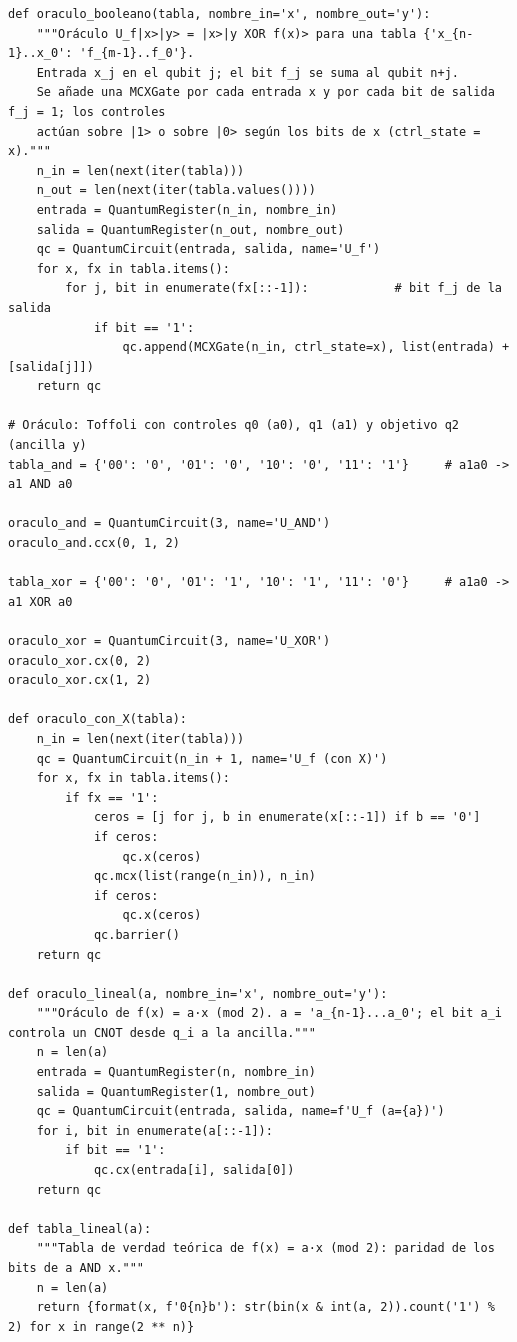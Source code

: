 \begin{lstlisting}[caption={Construcción de oráculos por minitérminos y casos particulares (ejercicios 1.1, 1.3, 1.4 y 1.6).},label={lst:b1_oraculos}]
def oraculo_booleano(tabla, nombre_in='x', nombre_out='y'):
    """Oráculo U_f|x>|y> = |x>|y XOR f(x)> para una tabla {'x_{n-1}..x_0': 'f_{m-1}..f_0'}.
    Entrada x_j en el qubit j; el bit f_j se suma al qubit n+j.
    Se añade una MCXGate por cada entrada x y por cada bit de salida f_j = 1; los controles
    actúan sobre |1> o sobre |0> según los bits de x (ctrl_state = x)."""
    n_in = len(next(iter(tabla)))
    n_out = len(next(iter(tabla.values())))
    entrada = QuantumRegister(n_in, nombre_in)
    salida = QuantumRegister(n_out, nombre_out)
    qc = QuantumCircuit(entrada, salida, name='U_f')
    for x, fx in tabla.items():
        for j, bit in enumerate(fx[::-1]):            # bit f_j de la salida
            if bit == '1':
                qc.append(MCXGate(n_in, ctrl_state=x), list(entrada) + [salida[j]])
    return qc

# Oráculo: Toffoli con controles q0 (a0), q1 (a1) y objetivo q2 (ancilla y)
tabla_and = {'00': '0', '01': '0', '10': '0', '11': '1'}     # a1a0 -> a1 AND a0

oraculo_and = QuantumCircuit(3, name='U_AND')
oraculo_and.ccx(0, 1, 2)

tabla_xor = {'00': '0', '01': '1', '10': '1', '11': '0'}     # a1a0 -> a1 XOR a0

oraculo_xor = QuantumCircuit(3, name='U_XOR')
oraculo_xor.cx(0, 2)
oraculo_xor.cx(1, 2)

def oraculo_con_X(tabla):
    n_in = len(next(iter(tabla)))
    qc = QuantumCircuit(n_in + 1, name='U_f (con X)')
    for x, fx in tabla.items():
        if fx == '1':
            ceros = [j for j, b in enumerate(x[::-1]) if b == '0']
            if ceros:
                qc.x(ceros)
            qc.mcx(list(range(n_in)), n_in)
            if ceros:
                qc.x(ceros)
            qc.barrier()
    return qc

def oraculo_lineal(a, nombre_in='x', nombre_out='y'):
    """Oráculo de f(x) = a·x (mod 2). a = 'a_{n-1}...a_0'; el bit a_i controla un CNOT desde q_i a la ancilla."""
    n = len(a)
    entrada = QuantumRegister(n, nombre_in)
    salida = QuantumRegister(1, nombre_out)
    qc = QuantumCircuit(entrada, salida, name=f'U_f (a={a})')
    for i, bit in enumerate(a[::-1]):
        if bit == '1':
            qc.cx(entrada[i], salida[0])
    return qc

def tabla_lineal(a):
    """Tabla de verdad teórica de f(x) = a·x (mod 2): paridad de los bits de a AND x."""
    n = len(a)
    return {format(x, f'0{n}b'): str(bin(x & int(a, 2)).count('1') % 2) for x in range(2 ** n)}
\end{lstlisting}

